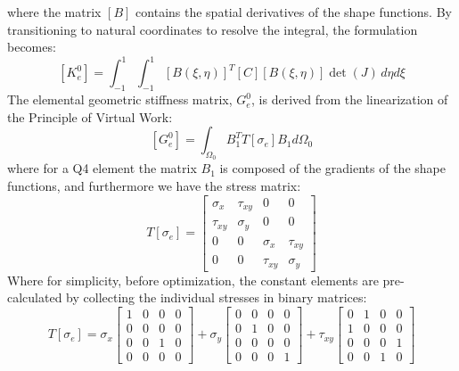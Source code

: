 \documentclass{article}
\begin{document}
where the matrix $[B]$ contains the spatial derivatives of the shape functions. By transitioning to natural coordinates to resolve the integral, the formulation becomes:
\begin{equation}\label{eq:ke0_nat}
[K_e^0] = \int_{-1}^{1} \int_{-1}^{1} [B(\xi, \eta)]^T [C] [B(\xi, \eta)] \det(J) \, d\eta d\xi
\end{equation}
\noindent The elemental geometric stiffness matrix, $G_e^0$, is derived from the linearization of the Principle of Virtual Work:
\begin{equation}\label{eq:ge0}
[G_e^0] = \int_{\Omega_0} B_1^T T[\sigma_e] B_1 d\Omega_0
\end{equation}
\noindent where for a Q4 element the matrix $B_1$ is composed of the gradients of the shape functions, and furthermore we have the stress matrix:
\begin{equation}\label{eq:tsigma}
T[\sigma_e] = \begin{bmatrix} \sigma_x & \tau_{xy} & 0 & 0 \\ \tau_{xy} & \sigma_y & 0 & 0 \\ 0 & 0 & \sigma_x & \tau_{xy} \\ 0 & 0 & \tau_{xy} & \sigma_y \end{bmatrix}
\end{equation}
\noindent Where for simplicity, before optimization, the constant elements are pre-calculated by collecting the individual stresses in binary matrices:
\begin{equation}\label{eq:tsigma_decomp}
T[\sigma_e] = \sigma_x \begin{bmatrix} 1 & 0 & 0 & 0 \\ 0 & 0 & 0 & 0 \\ 0 & 0 & 1 & 0 \\ 0 & 0 & 0 & 0 \end{bmatrix} + \sigma_y \begin{bmatrix} 0 & 0 & 0 & 0 \\ 0 & 1 & 0 & 0 \\ 0 & 0 & 0 & 0 \\ 0 & 0 & 0 & 1 \end{bmatrix} + \tau_{xy} \begin{bmatrix} 0 & 1 & 0 & 0 \\ 1 & 0 & 0 & 0 \\ 0 & 0 & 0 & 1 \\ 0 & 0 & 1 & 0 \end{bmatrix}
\end{equation}
\end{document}
